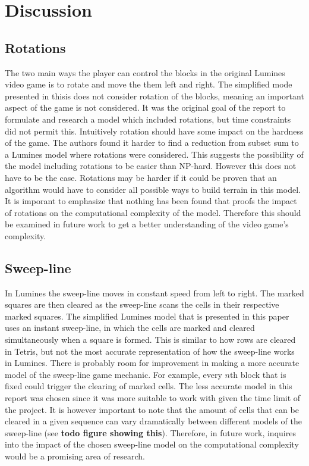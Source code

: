 \section{Discussion}
\label{discussion}

\subsection{Rotations}

The two main ways the player can control the blocks in the original Lumines video game is to rotate and move the them left and right. The simplified mode presented in thisis does not consider rotation of the blocks, meaning an important aspect of the game is not considered. It was the original goal of the report to formulate and research a model which included rotations, but time constraints did not permit this. Intuitively rotation should have some impact on the hardness of the game. The authors found it harder to find a reduction from subset sum to a Lumines model where rotations were considered. This suggests the possibility of the model including rotations to be easier than NP-hard. However this does not have to be the case. Rotations may be harder if it could be proven that an algorithm would have to consider all possible ways to build terrain in this model. It is imporant to emphasize that nothing has been found that proofs the impact of rotations on the computational complexity of the model. Therefore this should be examined in future work to get a better understanding of the video game's complexity.

\subsection{Sweep-line}

In Lumines the sweep-line moves in constant speed from left to right. The marked squares are then cleared as the sweep-line scans the cells in their respective marked squares. The simplified Lumines model that is presented in this paper uses an instant sweep-line, in which the cells are marked and cleared simultaneously when a square is formed. This is similar to how rows are cleared in Tetris, but not the most accurate representation of how the sweep-line works in Lumines. There is probably room for improvement in making a more accurate model of the sweep-line game mechanic. For example, every $n\text{th}$ block that is fixed could trigger the clearing of marked cells. The less accurate model in this report was chosen since it was more suitable to work with given the time limit of the project. It is however important to note that the amount of cells that can be cleared in a given sequence can vary dramatically between different models of the sweep-line (see \textbf{todo figure showing this}). Therefore, in future work, inquires into the impact of the chosen sweep-line model on the computational complexity would be a promising area of research.

